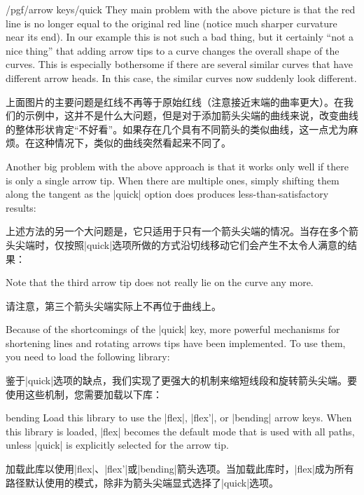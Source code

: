 \begin{key}{/pgf/arrow keys/quick}
    They main problem with the above picture is that the red line is no longer
    equal to the original red line (notice much sharper curvature near its
    end). In our example this is not such a bad thing, but it certainly ``not a
    nice thing'' that adding arrow tips to a curve changes the overall shape of
    the curves. This is especially bothersome if there are several similar
    curves that have different arrow heads. In this case, the similar curves
    now suddenly look different.

    上面图片的主要问题是红线不再等于原始红线（注意接近末端的曲率更大）。在我们的示例中，这并不是什么大问题，但是对于添加箭头尖端的曲线来说，改变曲线的整体形状肯定“不好看”。如果存在几个具有不同箭头的类似曲线，这一点尤为麻烦。在这种情况下，类似的曲线突然看起来不同了。

Another big problem with the above approach is that it works only well if
    there is only a single arrow tip. When there are multiple ones, simply
    shifting them along the tangent as the |quick| option does produces
    less-than-satisfactory results:
    
    上述方法的另一个大问题是，它只适用于只有一个箭头尖端的情况。当存在多个箭头尖端时，仅按照|quick|选项所做的方式沿切线移动它们会产生不太令人满意的结果：

\begin{codeexample}[]
\end{codeexample}
    Note that the third arrow tip does not really lie on the curve any more.

    请注意，第三个箭头尖端实际上不再位于曲线上。


\end{key}

Because of the shortcomings of the |quick| key, more powerful mechanisms for
shortening lines and rotating arrows tips have been implemented. To use them,
you need to load the following library:

鉴于|quick|选项的缺点，我们实现了更强大的机制来缩短线段和旋转箭头尖端。要使用这些机制，您需要加载以下库：
\begin{tikzlibrary}{bending}
    Load this library to use the |flex|, |flex'|, or |bending| arrow keys. When
    this library is loaded, |flex| becomes the default mode that is used with
    all paths, unless |quick| is explicitly selected for the arrow tip.

    加载此库以使用|flex|、|flex'|或|bending|箭头选项。当加载此库时，|flex|成为所有路径默认使用的模式，除非为箭头尖端显式选择了|quick|选项。
\end{tikzlibrary}

